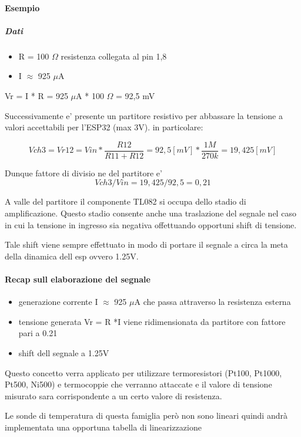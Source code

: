 \documentclass[12pt,a4paper]{report}
\begin{document}
\paragraph{Esempio}
\subparagraph{Dati}
\begin{itemize}
    \item R = 100 $\Omega$ resistenza collegata al pin 1,8
    \item I $\approx$ 925 $\mu$A 
\end{itemize}

Vr = I * R = 925 $\mu$A * 100 $\Omega$ = 92,5 mV

Successivamente e' presente un partitore resistivo per abbassare la tensione a valori accettabili per l'ESP32 (max 3V).
in particolare: 

\[ Vch3 = Vr12 = Vin * \frac{R12}{R11+R12} = 92,5 [mV] * \frac{1M}{270k} = 19,425 [mV] \]

Dunque fattore di divisio ne del partitore e' 
\[Vch3/Vin = 19,425/92,5 = 0,21 \]

A valle del partitore il componente TL082 si occupa dello stadio di amplificazione.
Questo stadio consente anche una traslazione del segnale nel caso in cui la tensione in ingresso sia negativa offettuando opportuni shift di tensione.

Tale shift viene sempre effettuato in modo di portare il segnale a circa la meta della dinamica dell esp ovvero 1.25V.

\paragraph{Recap sull elaborazione del segnale}
\begin{itemize}
    \item generazione corrente  I $\approx$ 925 $\mu$A che passa attraverso la resistenza esterna
    \item tensione generata Vr = R *I viene ridimensionata da partitore con fattore pari a 0.21
    \item shift dell segnale a 1.25V
\end{itemize}

Questo concetto verra applicato per utilizzare termoresistori (Pt100, Pt1000, Pt500, Ni500) e termocoppie che verranno attaccate e il valore di tensione misurato sara corrispondente a un certo valore di resistenza.

Le sonde di temperatura di questa famiglia però non sono lineari quindi andrà implementata una opportuna tabella di linearizzazione
\end{document}
